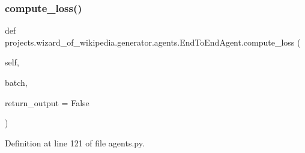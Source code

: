 \subsubsection{\texorpdfstring{compute\+\_\+loss()}{compute\_loss()}}
{\footnotesize\ttfamily def projects.\+wizard\+\_\+of\+\_\+wikipedia.\+generator.\+agents.\+End\+To\+End\+Agent.\+compute\+\_\+loss (\begin{DoxyParamCaption}\item[{}]{self,  }\item[{}]{batch,  }\item[{}]{return\+\_\+output = {\ttfamily False} }\end{DoxyParamCaption})}



Definition at line 121 of file agents.\+py.


